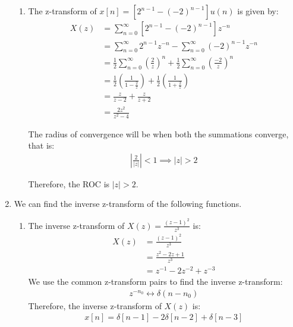 \documentclass{article}
\begin{document}
\begin{enumerate}[label=P1.\arabic*]
\begin{enumerate}
        \item The z-transform of $x[n] = \left[2^{n-1} - (-2)^{n-1}\right]u(n)$ is given by:
        \begin{align*}
            X(z) &= \sum_{n=0}^{\infty} \left[2^{n-1} - (-2)^{n-1}\right]z^{-n} \\
            &= \sum_{n=0}^{\infty} 2^{n-1}z^{-n} - \sum_{n=0}^{\infty} (-2)^{n-1}z^{-n} \\
            &= \frac{1}{2}\sum_{n=0}^{\infty} \left(\frac{2}{z}\right)^n + \frac{1}{2}\sum_{n=0}^{\infty} \left(\frac{-2}{z}\right)^n \\
            &= \frac{1}{2}\left(\frac{1}{1 - \frac{2}{z}}\right) + \frac{1}{2}\left(\frac{1}{1 + \frac{2}{z}}\right) \\
            &= \frac{z}{z - 2} + \frac{z}{z + 2} \\
            &= \frac{2z^2}{z^2 - 4}
        \end{align*}

        The radius of convergence will be when both the summations converge, that is:
        \begin{align*}
            \left|\frac{2}{|z|}\right| < 1 \implies |z| > 2
        \end{align*}

        Therefore, the ROC is $|z| > 2$.
    \end{enumerate}

    \item We can find the inverse z-transform of the following functions.
    \begin{enumerate}
        \item The inverse z-transform of $X(z) = \frac{(z-1)^2}{z^3}$ is:   
        \begin{align*}
            X(z) &= \frac{(z-1)^2}{z^3} \\
            &= \frac{z^2 - 2z + 1}{z^3} \\
            &= z^{-1} - 2z^{-2} + z^{-3}
        \end{align*}
        We use the common z-transform pairs to find the inverse z-transform:
        \begin{align*}
            z^{-n_0} \longleftrightarrow \delta(n-n_0)
        \end{align*}
        Therefore, the inverse z-transform of $X(z)$ is:
        \begin{align*}
            x[n] = \delta[n-1] - 2\delta[n-2] + \delta[n-3]
        \end{align*}
        

\end{enumerate}
\end{enumerate}
\end{document}
